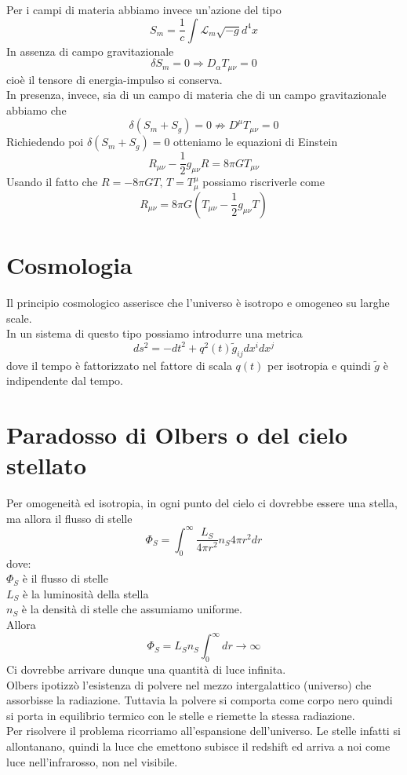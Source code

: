 \documentclass[10pt,a4paper]{article}
\theoremstyle{break}
\theoremstyle{remark}
\theoremstyle{definition}
\newcommand{\ra}{\Rightarrow}
\newcommand{\Lagr}{\mathcal{L}}
\begin{document}
Per i campi di materia abbiamo invece un'azione del tipo
\[
S_m = \frac1c \int \Lagr_m \sqrt{-g}d^4x
\]
In assenza di campo gravitazionale
\[
\delta S_m = 0 \ra D_\alpha T_{\mu \nu} = 0
\]
cioè il tensore di energia-impulso si conserva.
\\
In presenza, invece, sia di un campo di materia che di un campo gravitazionale abbiamo che 
\[
\delta(S_m + S_g) = 0 \not\ra D^\mu T_{\mu \nu} = 0 
\]
Richiedendo poi $\delta(S_m + S_g) = 0$ otteniamo le equazioni di Einstein
\[
\boxed{
R_{\mu \nu} - \frac12 g_{\mu \nu}R = 8\pi G T_{\mu \nu}
}
\]
Usando il fatto che $R = -8 \pi G T,\, T = T^\mu_\mu$ possiamo riscriverle come
\[
R_{\mu \nu} = 8\pi G(T_{\mu \nu} - \frac12 g_{\mu \nu}T)
\]

\section{Cosmologia}
Il principio cosmologico asserisce che l'universo è isotropo e omogeneo su larghe scale.
\\
In un sistema di questo tipo possiamo introdurre una metrica 
\[
ds^2 = -dt^2 + q^2(t) \tilde{g}_{ij} dx^i dx^j
\]
dove il tempo è fattorizzato nel fattore di scala $q(t)$ per isotropia e quindi $\tilde{g}$ è indipendente dal tempo.

\section{Paradosso di Olbers o del cielo stellato}
Per omogeneità ed isotropia, in ogni punto del cielo ci dovrebbe essere una stella, ma allora il flusso di stelle
\[
\Phi_S = \int_{0}^{\infty} \frac{L_S}{4 \pi r^2} n_S 4 \pi r^2 dr
\]
dove: \\
$\Phi_S$ è il flusso di stelle \\
$L_S $ è la luminosità della stella \\
$n_S$ è la densità di stelle che assumiamo uniforme.\\
Allora 
\[
\Phi_S = L_S n_S \int_{0}^{\infty} dr \to \infty
\]
Ci dovrebbe arrivare dunque una quantità di luce infinita.
\\
Olbers ipotizzò l'esistenza di polvere nel mezzo intergalattico (universo) che assorbisse la radiazione. Tuttavia la polvere si comporta come corpo nero quindi si porta in equilibrio termico con le stelle e riemette la stessa radiazione.
\\
Per risolvere il problema ricorriamo all'espansione dell'universo. Le stelle infatti si allontanano, quindi la luce che emettono subisce il redshift ed arriva a noi come luce nell'infrarosso, non nel visibile.
\end{document}
